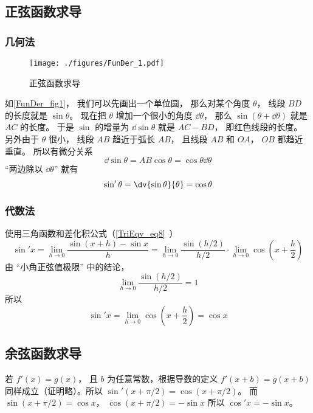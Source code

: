 \subsection{正弦函数求导}
\subsubsection{几何法}
\begin{figure}[ht]
\centering
\texttt{[image: ./figures/FunDer\_1.pdf]}
\caption{正弦函数求导} \label{FunDer_fig1}
\end{figure}
如\autoref{FunDer_fig1}， 我们可以先画出一个单位圆， 那么对某个角度 $\theta$， 线段 $BD$ 的长度就是 $\sin\theta$。 现在把 $\theta$ 增加一个很小的角度 $\dd{\theta}$， 那么 $\sin(\theta+\dd{\theta})$ 就是 $AC$ 的长度。 于是 $\sin$ 的增量为 $\dd{\sin\theta}$ 就是 $AC - BD$， 即红色线段的长度。 另外由于 $\theta$ 很小， 线段 $AB$ 趋近于弧长 $AB$， 且线段 $AB$ 和 $OA$， $OB$ 都趋近垂直。 所以有微分关系
\begin{equation}
\dd{\sin\theta} = AB \cos\theta = \cos\theta \dd{\theta}
\end{equation}
“两边除以 $\dd{\theta}$” 就有
\begin{equation}
\sin'\theta = \dv{\sin\theta}{\theta} = \cos\theta
\end{equation}

\subsubsection{代数法}
使用三角函数和差化积公式（\autoref{TriEqv_eq8}~）
\begin{equation}
\sin'x = \lim_{h \to 0} \frac{\sin (x + h) - \sin x}{h} = \lim_{h \to 0} \frac{\sin (h/2)}{h/2} \cdot \lim_{h \to 0}\cos( x + \frac{h}{2})
\end{equation}
由 “小角正弦值极限” 中的结论，
\begin{equation}
\lim_{h \to 0} \frac{\sin (h/2)}{h/2} = 1
\end{equation}
所以
\begin{equation}
\sin'x =  \lim_{h \to 0}\cos( x + \frac{h}{2}) = \cos x
\end{equation}

\subsection{余弦函数求导}
若 $f'(x) = g(x)$， 且 $b$ 为任意常数，根据导数的定义 $f'(x + b) = g(x + b)$ 同样成立（证明略）。所以 $\sin'(x + \pi/2) = \cos(x + \pi/2)$。 而 $\sin(x + \pi/2) = \cos x$，  $\cos(x + \pi/2) =  - \sin x$ 所以 $\cos' x =  - \sin x$。


